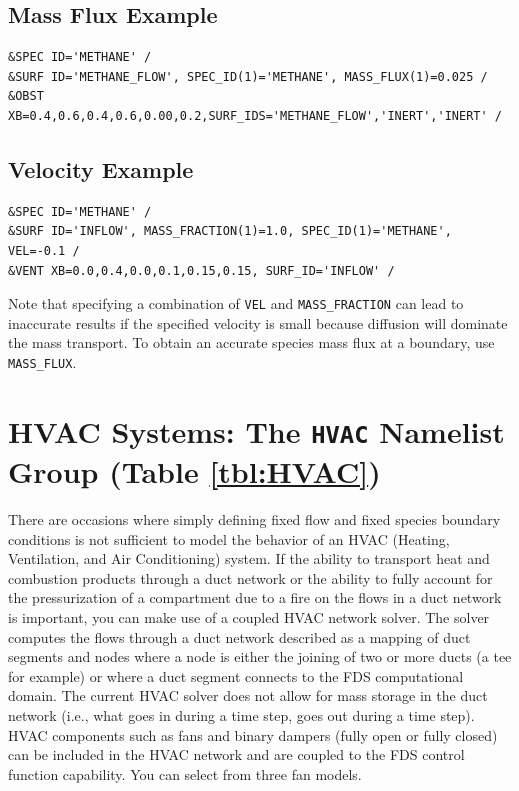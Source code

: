 \documentclass[11pt]{book}
\newcommand{\ct}{\tt\small}
\begin{document}
\subsection*{Mass Flux Example}

\footnotesize
\begin{verbatim}
&SPEC ID='METHANE' /
&SURF ID='METHANE_FLOW', SPEC_ID(1)='METHANE', MASS_FLUX(1)=0.025 /
&OBST XB=0.4,0.6,0.4,0.6,0.00,0.2,SURF_IDS='METHANE_FLOW','INERT','INERT' /
\end{verbatim}\normalsize


\subsection*{Velocity Example}

\footnotesize
\begin{verbatim}
&SPEC ID='METHANE' /
&SURF ID='INFLOW', MASS_FRACTION(1)=1.0, SPEC_ID(1)='METHANE', VEL=-0.1 /
&VENT XB=0.0,0.4,0.0,0.1,0.15,0.15, SURF_ID='INFLOW' /
\end{verbatim}\normalsize

\noindent Note that specifying a combination of {\ct VEL} and {\ct MASS\_FRACTION} can lead to inaccurate results if the specified velocity is small because diffusion will dominate the mass transport.  To obtain an accurate species mass flux at a boundary, use {\ct MASS\_FLUX}.





\clearpage

\section{HVAC Systems: The \texorpdfstring{{\tt HVAC}}{HVAC} Namelist Group (Table \ref{tbl:HVAC})}
\label{info:HVAC}

There are occasions where simply defining fixed flow and fixed species boundary conditions is not sufficient to model the behavior of an HVAC (Heating, Ventilation, and Air Conditioning) system.
If the ability to transport heat and combustion products through a duct network or the ability to fully account for the pressurization of a compartment
due to a fire on the flows in a duct network is important, you can make use of a coupled HVAC network solver.  The solver computes the flows through a
duct network described as a mapping of duct segments and nodes where a node is either the joining of two or more ducts (a tee for example) or where a duct segment connects to the FDS computational domain.
The current HVAC solver does not allow for mass storage in the duct network (i.e., what goes in during a time step, goes out during a time step).
HVAC components such as fans and binary dampers (fully open or fully closed) can be included in the HVAC network and are coupled to the FDS control function capability.  You can select from three fan models.
\end{document}
